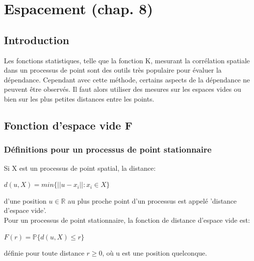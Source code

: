 \documentclass[french,12pt,a4paper]{report}
\begin{document}

\chapter{Espacement (chap. 8)}

\section{Introduction}
Les fonctions statistiques, telle que la fonction K, mesurant la corrélation spatiale dans un processus de point sont des outils très populaire pour évaluer la dépendance. Cependant avec cette méthode, certains aspects de la dépendance ne peuvent être observés. Il faut alors utiliser des mesures sur les espaces vides ou bien sur les plus petites distances entre les points.


\section{Fonction d'espace vide F}

\subsection{Définitions pour un processus de point stationnaire}
Si X est un processus de point spatial, la distance:
\begin{center}\begin{math} d(u,X) = min\{ ||u-x_i|| : x_i \in X \} \end{math}\end{center}
d'une position \begin{math} u \in \mathbb{R} \end{math} au plus proche point d'un processus est appelé 'distance d'espace vide'.\\
Pour un processus de point stationnaire, la fonction de distance d'espace vide est:
\begin{center}\begin{math} F(r) = \mathbb{P}\{ d(u,X) \leq r \} \end{math}\end{center}
définie pour toute distance \begin{math} r \geq 0 \end{math}, où u est une position quelconque.\\
\end{document}
